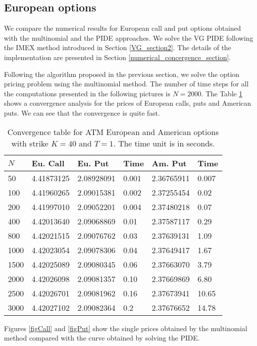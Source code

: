 \subsection{European options}


We compare the numerical results for European call and put options obtained with the multinomial and the PIDE approaches.
We solve the VG PIDE following the IMEX method introduced in Section \ref{VG_section2}.
The details of the implementation are presented in Section \ref{numerical_concergence_section}. 

Following the algorithm proposed in the previous section, we solve the option pricing problem using the multinomial method. 
The number of time steps for all the computations presented in the following pictures is $N=2000$. 
The Table \ref{Convergence} 
shows a convergence analysis for the prices of European calls, puts and American puts. We can see that the convergence is quite fast.  
\begin{table}[ht]
\centering
{\begin{tabular}{llllll}
\toprule
  $N$ & Eu. Call & Eu. Put & Time & Am. Put & Time \\
\midrule
    50 & 4.41873125 & 2.08928091 & 0.001 & 2.36765911 & 0.007 \\
    100 & 4.41960265 & 2.09015381 & 0.002 & 2.37255454 & 0.02 \\
    200 & 4.41997010 & 2.09052201 & 0.004 & 2.37480218 & 0.07 \\
    400 & 4.42013640 & 2.09068869 & 0.01 & 2.37587117 & 0.29 \\
    800 & 4.42021515 & 2.09076762 & 0.03 & 2.37639131 & 1.09 \\
    1000 & 4.42023054 & 2.09078306 & 0.04 & 2.37649417 & 1.67 \\
    1500 & 4.42025089 & 2.09080345 & 0.06 & 2.37663070 & 3.79 \\
    2000 & 4.42026098 & 2.09081357 & 0.10 & 2.37669869 & 6.80 \\
    2500 & 4.42026701 & 2.09081962 & 0.16 & 2.37673941 & 10.65 \\
    3000 & 4.42027102 & 2.09082364 & 0.2 & 2.37676652 & 14.78 \\
  \bottomrule
\end{tabular}}
\caption{Convergence table for ATM European and American options with strike $K=40$ and $T=1$. The time unit is in seconds.}
\label{Convergence}
\end{table}
Figures \ref{figCall} and \ref{figPut} show the single prices obtained by the multinomial method compared with the curve obtained by solving the PIDE.
